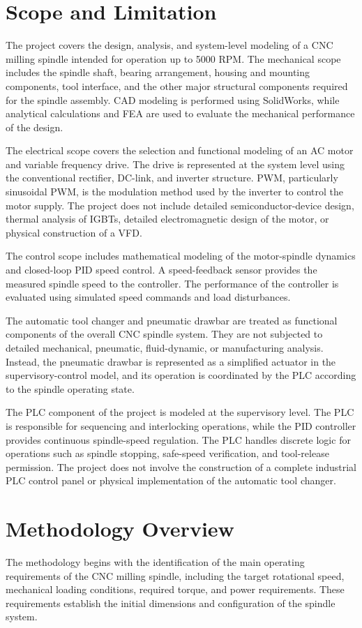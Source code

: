 \documentclass[12pt,a4paper]{report}
\begin{document}
	\section{Scope and Limitation}
	The project covers the design, analysis, and system-level modeling of a CNC milling spindle intended for operation up to 5000 RPM. The mechanical scope includes the spindle shaft, bearing arrangement, housing and mounting components, tool interface, and the other major structural components required for the spindle assembly. CAD modeling is performed using SolidWorks, while analytical calculations and FEA are used to evaluate the mechanical performance of the design.
	
	The electrical scope covers the selection and functional modeling of an AC motor and variable frequency drive. The drive is represented at the system level using the conventional rectifier, DC-link, and inverter structure. PWM, particularly sinusoidal PWM, is the modulation method used by the inverter to control the motor supply. The project does not include detailed semiconductor-device design, thermal analysis of IGBTs, detailed electromagnetic design of the motor, or physical construction of a VFD.
	
	The control scope includes mathematical modeling of the motor-spindle dynamics and closed-loop PID speed control. A speed-feedback sensor provides the measured spindle speed to the controller. The performance of the controller is evaluated using simulated speed commands and load disturbances.
	
	The automatic tool changer and pneumatic drawbar are treated as functional components of the overall CNC spindle system. They are not subjected to detailed mechanical, pneumatic, fluid-dynamic, or manufacturing analysis. Instead, the pneumatic drawbar is represented as a simplified actuator in the supervisory-control model, and its operation is coordinated by the PLC according to the spindle operating state.
	
	The PLC component of the project is modeled at the supervisory level. The PLC is responsible for sequencing and interlocking operations, while the PID controller provides continuous spindle-speed regulation. The PLC handles discrete logic for operations such as spindle stopping, safe-speed verification, and tool-release permission. The project does not involve the construction of a complete industrial PLC control panel or physical implementation of the automatic tool changer.
	
	\section{Methodology Overview}
	The methodology begins with the identification of the main operating requirements of the CNC milling spindle, including the target rotational speed, mechanical loading conditions, required torque, and power requirements. These requirements establish the initial dimensions and configuration of the spindle system.
	
\end{document}
